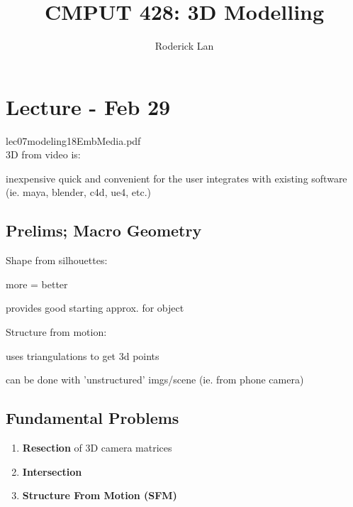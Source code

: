 \documentclass{article}
\title{CMPUT 428: 3D Modelling}
\author{Roderick Lan}
\date{}
\begin{document}
\makeatother
{}

\maketitle
\tableofcontents
\break

\section{Lecture - Feb 29}
lec07modeling18EmbMedia.pdf\\[5pt]
3D from video is:
\begin{outline}
    \1 inexpensive
    \1 quick and convenient for the user
    \1 integrates with existing software (ie. maya, blender, c4d, ue4, etc.)
\end{outline}
\subsection{Prelims; Macro Geometry}
Shape from silhouettes:
\begin{list}{}{}
    \item more = better
    \item provides good starting approx. for object
\end{list}
Structure from motion: %
\begin{list}{}{}
    \item uses triangulations to get 3d points
    \item can be done with 'unstructured' imgs/scene (ie. from phone camera)
\end{list}


\subsection{Fundamental Problems}
\begin{enumerate}
    \item \textbf{Resection} of 3D camera matrices
    \item \textbf{Intersection}
    \item \textbf{Structure From Motion (SFM)}
\end{enumerate}
\end{document}
